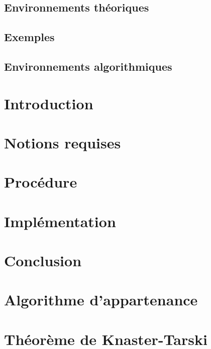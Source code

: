 

\newcommand{\student}{Benjamin André}
\newcommand{\grade}{MAB2 Sciences Informatiques}
\newcommand{\director}{Véronique Bruyère}
\renewcommand{\title}{Vérification de la sécurité d'automates à file par apprentissage actif}
\renewcommand{\date}{\today}



	

	\tableofcontents
	\newpage

	\section*{Environnements théoriques}

	\section*{Exemples}

	\section*{Environnements algorithmiques}

	\newpage
	

	\chapter{Introduction}\label{intro}
	\chapter{Notions requises}\label{pre}
	\chapter{Procédure}\label{pro}
	\chapter{Implémentation}\label{impl}%
	\chapter{Conclusion}\label{ccl}%

	\newpage
	
	

	\appendix
	\chapter{Algorithme d'appartenance}\label{app:membership}
	\chapter{Théorème de Knaster-Tarski}\label{app:tarski}



